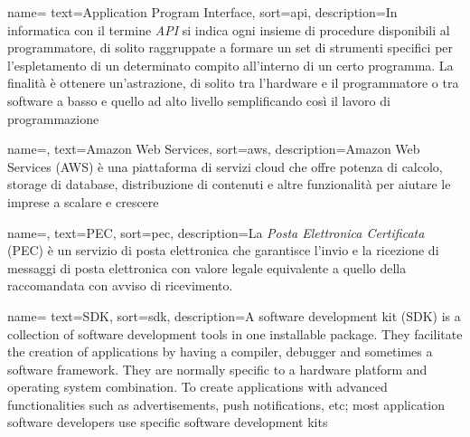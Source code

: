 




 {
    name=
    text=Application Program Interface,
    sort=api,
    description={In informatica con il termine \emph{API} si indica ogni insieme di procedure disponibili al programmatore, di solito raggruppate a formare un set di strumenti specifici per l'espletamento di un determinato compito all'interno di un certo programma. La finalità è ottenere un'astrazione, di solito tra l'hardware e il programmatore o tra software a basso e quello ad alto livello semplificando così il lavoro di programmazione}
}

 {
    name=,
    text=Amazon Web Services,
    sort=aws,
    description={Amazon Web Services (AWS) è una piattaforma di servizi cloud che offre potenza di calcolo, storage di database, distribuzione di contenuti e altre funzionalità per aiutare le imprese a scalare e crescere}
}

 {
    name=,
    text=PEC,
    sort=pec,
    description={La \emph{Posta Elettronica Certificata} (PEC) è un servizio di posta elettronica che garantisce l'invio e la ricezione di messaggi di posta elettronica con valore legale equivalente a quello della raccomandata con avviso di ricevimento.}
}

 {
    name=
    text=SDK,
    sort=sdk,
    description={A software development kit (SDK) is a collection of software development tools in one installable package. They facilitate the creation of applications by having a compiler, debugger and sometimes a software framework. They are normally specific to a hardware platform and operating system combination. To create applications with advanced functionalities such as advertisements, push notifications, etc; most application software developers use specific software development kits}
}

